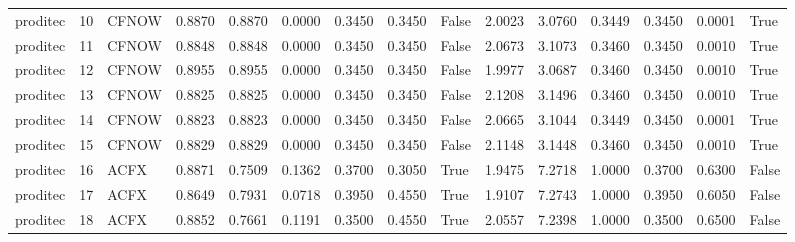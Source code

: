 \begin{tabular}{lrlrrrrrlrrrrrl}
proditec &     10 &  CFNOW &      0.8870 &    0.8870 &       0.0000 &                 0.3450 &           0.3450 &           False &       2.0023 &                  3.0760 &                              0.3449 &         0.3450 &                0.0001 &                  True \\
proditec &     11 &  CFNOW &      0.8848 &    0.8848 &       0.0000 &                 0.3450 &           0.3450 &           False &       2.0673 &                  3.1073 &                              0.3460 &         0.3450 &                0.0010 &                  True \\
proditec &     12 &  CFNOW &      0.8955 &    0.8955 &       0.0000 &                 0.3450 &           0.3450 &           False &       1.9977 &                  3.0687 &                              0.3460 &         0.3450 &                0.0010 &                  True \\
proditec &     13 &  CFNOW &      0.8825 &    0.8825 &       0.0000 &                 0.3450 &           0.3450 &           False &       2.1208 &                  3.1496 &                              0.3460 &         0.3450 &                0.0010 &                  True \\
proditec &     14 &  CFNOW &      0.8823 &    0.8823 &       0.0000 &                 0.3450 &           0.3450 &           False &       2.0665 &                  3.1044 &                              0.3449 &         0.3450 &                0.0001 &                  True \\
proditec &     15 &  CFNOW &      0.8829 &    0.8829 &       0.0000 &                 0.3450 &           0.3450 &           False &       2.1148 &                  3.1448 &                              0.3460 &         0.3450 &                0.0010 &                  True \\
proditec &     16 &   ACFX &      0.8871 &    0.7509 &       0.1362 &                 0.3700 &           0.3050 &            True &       1.9475 &                  7.2718 &                              1.0000 &         0.3700 &                0.6300 &                 False \\
proditec &     17 &   ACFX &      0.8649 &    0.7931 &       0.0718 &                 0.3950 &           0.4550 &            True &       1.9107 &                  7.2743 &                              1.0000 &         0.3950 &                0.6050 &                 False \\
proditec &     18 &   ACFX &      0.8852 &    0.7661 &       0.1191 &                 0.3500 &           0.4550 &            True &       2.0557 &                  7.2398 &                              1.0000 &         0.3500 &                0.6500 &                 False \\

\end{tabular}
